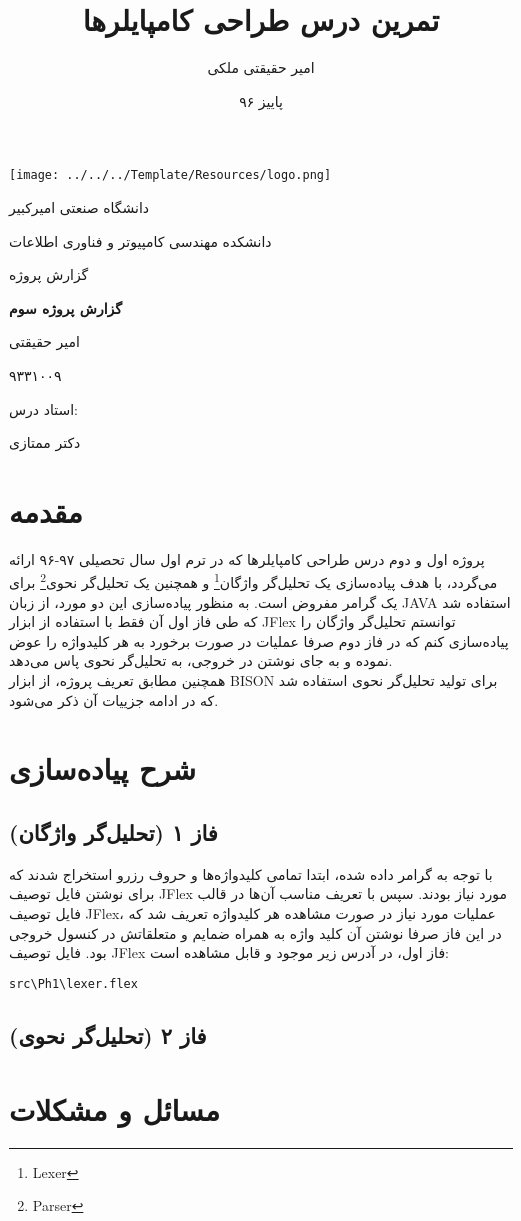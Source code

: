 \documentclass{article}
\title{تمرین درس طراحی کامپایلرها}
\author{امیر حقیقتی ملکی}
\date{پاییز ۹۶}
\theoremstyle{definition}
\begin{document}
		\begin{titlepage}
		\centering
		\texttt{[image: ../../../Template/Resources/logo.png]}\par\vspace{1cm}
		{\scshape\LARGE دانشگاه صنعتی امیرکبیر \par}
		{\scshape\LARGE دانشکده مهندسی کامپیوتر و فناوری اطلاعات \par}
		\vspace{1cm}
		{\scshape\Large
	گزارش پروژه
			\par}
		\vspace{1.5cm}
		{\huge\bfseries 
			گزارش پروژه سوم
			\par}
		\vspace{2cm}
		{\Large امیر حقیقتی \par}
		{\Large ۹۳۳۱۰۰۹\par}
		\vfill
		استاد درس:\par
		دکتر ممتازی
		\vfill
		
		{\large {}\par}
	\end{titlepage}
	\newpage
	\tableofcontents
	\newpage
	\section{مقدمه}
	پروژه اول و دوم درس طراحی کامپایلرها که در ترم اول سال تحصیلی ۹۷-۹۶ ارائه می‌گردد، با هدف پیاده‌سازی یک تحلیل‌گر واژگان\footnote{Lexer} و همچنین یک تحلیل‌گر نحوی\footnote{Parser} برای یک گرامر مفروض است. به منظور پیاده‌سازی این دو مورد،  از زبان JAVA استفاده شد که طی فاز اول آن فقط با استفاده از ابزار  JFlex توانستم تحلیل‌گر واژگان را پیاده‌سازی کنم که در فاز دوم صرفا عملیات در صورت برخورد به هر کلیدواژه را عوض نموده و به جای نوشتن در خروجی، به تحلیل‌گر نحوی پاس می‌دهد. \\
	همچنین مطابق تعریف پروژه، از ابزار BISON برای تولید تحلیل‌گر نحوی استفاده شد که در ادامه جزییات آن ذکر می‌شود.
	\section{شرح پیاده‌سازی}
	\subsection{فاز ۱ (تحلیل‌گر واژگان)}
	با توجه به گرامر داده شده، ابتدا تمامی کلیدواژه‌ها و حروف رزرو استخراج شدند که برای نوشتن فایل توصیف JFlex مورد نیاز بودند. سپس با تعریف مناسب آن‌ها در قالب فایل توصیف JFlex، عملیات مورد نیاز در صورت مشاهده هر کلیدواژه تعریف شد که در این فاز صرفا نوشتن آن کلید واژه به همراه ضمایم و متعلقاتش در کنسول خروجی بود. فایل توصیف JFlex فاز اول،‌ در آدرس زیر موجود و قابل مشاهده است:
	\begin{latin}
\begin{lstlisting}[language=bash]
src\Ph1\lexer.flex
\end{lstlisting}
	\end{latin}
	\subsection{فاز ۲ (تحلیل‌گر نحوی)}
	\section{مسائل و مشکلات}
\end{document}
